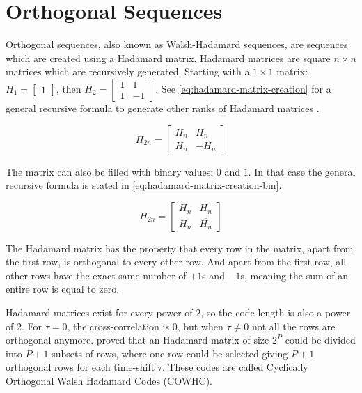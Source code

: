 
\section{Orthogonal Sequences}
\label{sec:orthogonal-sequences}

Orthogonal sequences, also known as Walsh-Hadamard sequences, are sequences which are created using a Hadamard matrix.
Hadamard matrices are square $n \times n$ matrices which are recursively generated.
Starting with a $1 \times 1$ matrix: 
		$H_{1} = \begin{bmatrix} 1 \end{bmatrix}$, then 
		$H_{2} = \begin{bmatrix} 1 & 1 \\ 1 & -1 \end{bmatrix}$.
See \autoref{eq:hadamard-matrix-creation} for a general recursive formula to generate other ranks of Hadamard matrices \cite{714616}.

\begin{equation}
	H_{2n} = 
	\begin{bmatrix} 
		H_n & H_n \\ 
		H_n & -H_n 
	\end{bmatrix}
	\label{eq:hadamard-matrix-creation}
\end{equation}

The matrix can also be filled with binary values: $0$ and $1$. In that case the general recursive formula is stated in \autoref{eq:hadamard-matrix-creation-bin}. 

\begin{equation}
	H_{2n} = 
	\begin{bmatrix} 
		H_n & H_n \\ 
		H_n & \overline{H_n}
	\end{bmatrix}
	\label{eq:hadamard-matrix-creation-bin}
\end{equation}




The Hadamard matrix has the property that every row in the matrix, apart from the first row, is orthogonal to every other row.
And apart from the first row, all other rows have the exact same number of $+1$s and $-1$s, meaning the sum of an entire row is equal to zero.

Hadamard matrices exist for every power of $2$, so the code length is also a power of $2$.
For $\tau = 0$, the cross-correlation is $0$, but when $\tau \neq 0$ not all the rows are orthogonal anymore.
\cite{1182447} proved that an Hadamard matrix of size $2^P$ could be divided into $P + 1$ subsets of rows, where one row could be selected giving $P + 1$ orthogonal rows for each time-shift $\tau$.
These codes are called Cyclically Orthogonal Walsh Hadamard Codes (COWHC).


